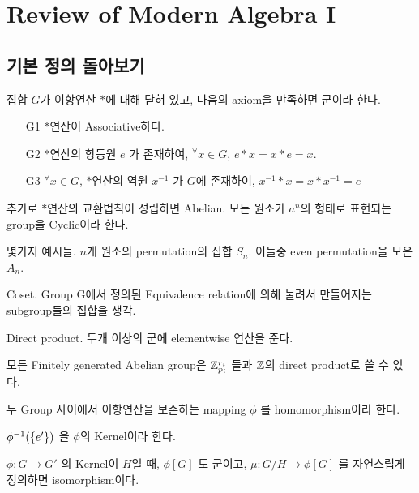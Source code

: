 
\setcounter{section}{-1}
\LectureDate{-}
\section{Review of Modern Algebra I}
\subsection{기본 정의 돌아보기}
\begin{definition}[Group]
    집합 $G$가 이항연산 $*$에 대해 닫혀 있고, 다음의 axiom을 만족하면 군이라 한다.
    \begin{itemize}
        \item[G1] $*$연산이 Associative하다.
        \item[G2] $*$연산의 항등원 $e$ 가 존재하여, $^\forall x \in G$, $e * x = x * e = x$.
        \item[G3] $^\forall x \in G$, $*$연산의 역원 $x^{-1}$ 가 $G$에 존재하여, $x^{-1} * x = x * x^{-1} = e$
    \end{itemize}
\end{definition}
추가로 $*$연산의 교환법칙이 성립하면 Abelian. 모든 원소가 $a^n$의 형태로 표현되는 group을 Cyclic이라 한다.

몇가지 예시들. $n$개 원소의 permutation의 집합 $S_n$. 이들중 even permutation을 모은 $A_n$.

Coset. Group G에서 정의된 Equivalence relation에 의해 눌려서 만들어지는 subgroup들의 집합을 생각.

Direct product. 두개 이상의 군에 elementwise 연산을 준다.

\begin{theorem}
    모든 Finitely generated Abelian group은 $\mathbb{Z}_{p_i}^{r_i}$ 들과 $\mathbb{Z}$의 direct product로 쓸 수 있다.
\end{theorem}

\begin{definition}[Homomorphism]
    두 Group 사이에서 이항연산을 보존하는 mapping $\phi$ 를 homomorphism이라 한다.
\end{definition}
$\phi^{-1}(\left\{ e' \right\})$ 을 $\phi$의 Kernel이라 한다.

\begin{theorem}
    $\phi : G \to G'$ 의 Kernel이 $H$일 때, $\phi[G]$ 도 군이고, $\mu : G/H \to \phi[G]$ 를 자연스럽게 정의하면 isomorphism이다.
\end{theorem}

